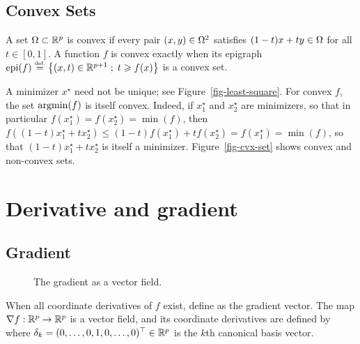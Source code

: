 \subsection{Convex Sets}

A set $\Omega \subset \mathbb{R}^p$ is convex if every pair $(x,y) \in \Omega^2$ satisfies $(1-t)x + t y \in \Omega$ for all $t \in [0,1]$.
%
A function $f$ is convex exactly when its epigraph $\text{epi}(f) \stackrel{\mbox{\upshape\tiny def.}}{=} \left\{ (x,t) \in \mathbb{R}^{p+1} \;;\; t \geqslant f(x) \right\}$ is a convex set.

\begin{rem}
A minimizer $x^\star$ need not be unique; see Figure~\ref{fig-least-square}.
%
For convex $f$, the set $\operatorname{argmin}(f)$ is itself convex.
%
Indeed, if $x_1^\star$ and $x_2^\star$ are minimizers, so that in particular $f(x_1^\star)=f(x_2^\star)=\min(f)$, then $f( (1-t)x_1^\star + t x_2^\star ) \leq (1-t) f(x_1^\star) + t f(x_2^\star) = f(x_1^\star) = \min(f)$, so that $(1-t)x_1^\star + t x_2^\star$ is itself a minimizer. Figure~\ref{fig-cvx-set} shows convex and non-convex sets. 
\end{rem}



\section{Derivative and gradient}

\subsection{Gradient}


\begin{figure}[tbp]
\centering
{}
\caption{The gradient as a vector field.}
\label{fig-review-smooth-gradient-field}
\end{figure}
When all coordinate derivatives of $f$ exist, define
as the gradient vector. The map $\nabla f : \mathbb{R}^p \rightarrow \mathbb{R}^p$ is a vector field, and its coordinate derivatives are defined by
where $\delta_k=(0,\ldots,0,1,0,\ldots,0)^\top \in \mathbb{R}^p$ is the $k$th canonical basis vector.

